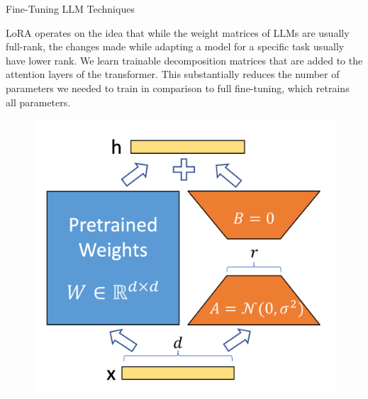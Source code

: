 \documentclass[final]{beamer}
\newlength{\colwidth}
\begin{document}
\begin{frame}[t]
\begin{columns}[t]
\begin{column}{\colwidth}
\begin{block}{Fine-Tuning LLM Techniques}
\begin{minipage}[t]{.65\textwidth}
        \end{minipage}
        \begin{minipage}[t]{.65\textwidth}
            \raggedright
        LoRA operates on the idea that while the weight matrices of LLMs are usually full-rank, the changes made while adapting a model for a specific task usually have lower rank. We learn trainable decomposition matrices that are added to the attention layers of the transformer. This substantially reduces the number of parameters we needed to train in comparison to full fine-tuning, which retrains all parameters. 
        \end{minipage}\hfill
        \begin{minipage}[t]{.30\textwidth}
        \vspace{-1em}
            \begin{figure}[t]
            \centering
            \includegraphics[width=\textwidth]{logos/lora.png}
            \end{figure}
            \raggedleft
        \end{minipage}
        \begin{minipage}[t]{.30\textwidth}
        \vspace{-1em}
            \begin{figure}[t]

\end{figure}
\end{minipage}
\end{block}
\end{column}
\end{columns}
\end{frame}
\end{document}
